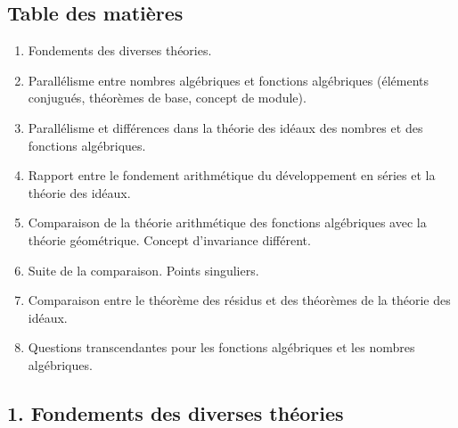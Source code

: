 \subsection*{Table des matières}
\begin{enumerate}
\item Fondements des diverses théories.
\item Parallélisme entre nombres algébriques et fonctions algébriques (éléments conjugués, théorèmes de base, concept de module).
\item Parallélisme et différences dans la théorie des idéaux des nombres et des fonctions algébriques.
\item Rapport entre le fondement arithmétique du développement en séries et la théorie des idéaux.
\item Comparaison de la théorie arithmétique des fonctions algébriques avec la théorie géométrique. Concept d'invariance différent.
\item Suite de la comparaison. Points singuliers.
\item Comparaison entre le théorème des résidus et des théorèmes de la théorie des idéaux.
\item Questions transcendantes pour les fonctions algébriques et les nombres algébriques.
\end{enumerate}

\subsection*{1. Fondements des diverses théories}

